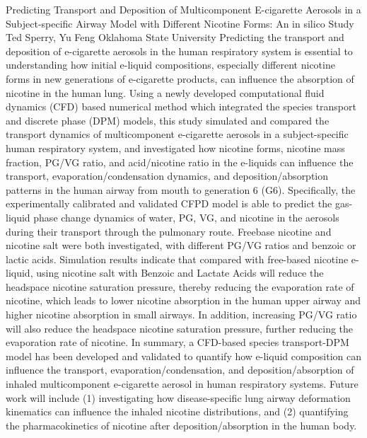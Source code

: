 \vspace{1.5ex}
\abs
{Predicting Transport and Deposition of Multicomponent E-cigarette Aerosols in a Subject-specific Airway Model with Different Nicotine Forms: An in silico Study}
{Ted Sperry, Yu Feng}
{Oklahoma State University}
{Predicting the transport and deposition of e-cigarette aerosols in the human respiratory system is essential to understanding how initial e-liquid compositions, especially different nicotine forms in new generations of e-cigarette products, can influence the absorption of nicotine in the human lung. Using a newly developed computational fluid dynamics (CFD) based numerical method which integrated the species transport and discrete phase (DPM) models, this study simulated and compared the transport dynamics of multicomponent e-cigarette aerosols in a subject-specific human respiratory system, and investigated how nicotine forms, nicotine mass fraction, PG/VG ratio, and acid/nicotine ratio in the e-liquids can influence the transport, evaporation/condensation dynamics, and deposition/absorption patterns in the human airway from mouth to generation 6 (G6). Specifically, the experimentally calibrated and validated CFPD model is able to predict the gas-liquid phase change dynamics of water, PG, VG, and nicotine in the aerosols during their transport through the pulmonary route. Freebase nicotine and nicotine salt were both investigated, with different PG/VG ratios and benzoic or lactic acids. Simulation results indicate that compared with free-based nicotine e-liquid, using nicotine salt with Benzoic and Lactate Acids will reduce the headspace nicotine saturation pressure, thereby reducing the evaporation rate of nicotine, which leads to lower nicotine absorption in the human upper airway and higher nicotine absorption in small airways. In addition, increasing PG/VG ratio will also reduce the headspace nicotine saturation pressure, further reducing the evaporation rate of nicotine. In summary, a CFD-based species transport-DPM model has been developed and validated to quantify how e-liquid composition can influence the transport, evaporation/condensation, and deposition/absorption of inhaled multicomponent e-cigarette aerosol in human respiratory systems. Future work will include (1) investigating how disease-specific lung airway deformation kinematics can influence the inhaled nicotine distributions, and (2) quantifying the pharmacokinetics of nicotine after deposition/absorption in the human body.}


